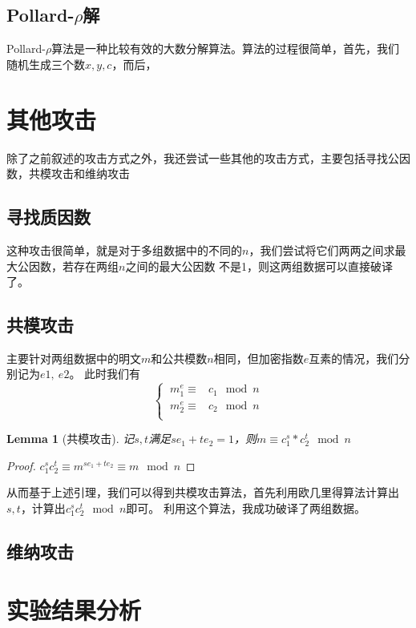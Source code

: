 \documentclass{ctexart}
\newtheorem{lemma}[theorem]{Lemma}
\begin{document}
\subsection{Pollard-\texorpdfstring{$\rho$}分解}
Pollard-$\rho$算法是一种比较有效的大数分解算法。算法的过程很简单，首先，我们随机生成三个数$x,y,c$，而后，


\section{其他攻击}
除了之前叙述的攻击方式之外，我还尝试一些其他的攻击方式，主要包括寻找公因数，共模攻击和维纳攻击
\subsection{寻找质因数}
这种攻击很简单，就是对于多组数据中的不同的$n$，我们尝试将它们两两之间求最大公因数，若存在两组$n$之间的最大公因数
不是1，则这两组数据可以直接破译了。
\subsection{共模攻击}
主要针对两组数据中的明文$m$和公共模数$n$相同，但加密指数$e$互素的情况，我们分别记为$e1,\ e2$。
此时我们有
\begin{equation*}
    \begin{cases}
    \ m^e_1\equiv& c_1 \mod n\\
    \ m^e_2\equiv& c_2  \mod n \\
    \end{cases} 
\end{equation*}
\begin{lemma}[共模攻击]
    记$s,t$满足$se_1+te_2=1$，则$m\equiv c_1^s*c_2^t\mod n$
\end{lemma}
\begin{proof}
    $c_1^sc_2^t\equiv m^{se_1+te_2}\equiv m \mod n$
\end{proof}
从而基于上述引理，我们可以得到共模攻击算法，首先利用欧几里得算法计算出$s,t$，计算出$c_1^sc_2^t\mod n$即可。
利用这个算法，我成功破译了两组数据。
\subsection{维纳攻击}

\section{实验结果分析}
\end{document}
